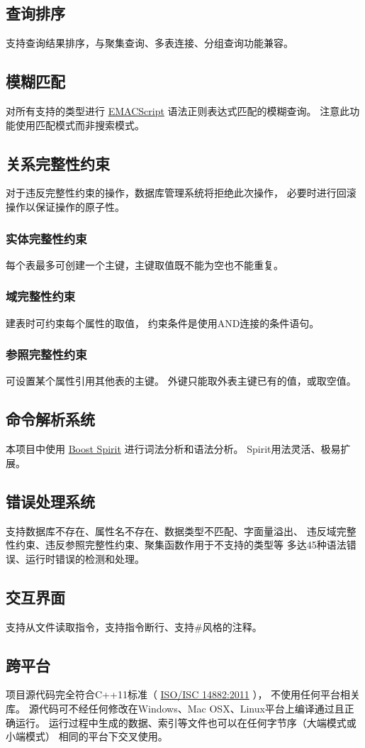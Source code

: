     \subsection{查询排序}
        支持查询结果排序，与聚集查询、多表连接、分组查询功能兼容。
    \subsection{模糊匹配}
        对所有支持的类型进行%
        \href{http://ecma-international.org/ecma-262/5.1/#sec-15.10}{EMACScript}%
        语法正则表达式匹配的模糊查询。%
        注意此功能使用匹配模式而非搜索模式。
    \subsection{关系完整性约束}
        对于违反完整性约束的操作，数据库管理系统将拒绝此次操作，%
        必要时进行回滚操作以保证操作的原子性。
        \subsubsection{实体完整性约束}
            每个表最多可创建一个主键，主键取值既不能为空也不能重复。
        \subsubsection{域完整性约束}
            建表时可约束每个属性的取值，%
            约束条件是使用AND连接的条件语句。%
        \subsubsection{参照完整性约束}
            可设置某个属性引用其他表的主键。%
            外键只能取外表主键已有的值，或取空值。
    \subsection{命令解析系统}
        本项目中使用%
        \href{http://www.boost.org/doc/libs/1_57_0/libs/spirit/doc/html/index.html}{Boost Spirit}%
        进行词法分析和语法分析。%
        Spirit用法灵活、极易扩展。
    \subsection{错误处理系统}
        支持数据库不存在、属性名不存在、数据类型不匹配、字面量溢出、%
        违反域完整性约束、违反参照完整性约束、聚集函数作用于不支持的类型等%
        多达45种语法错误、运行时错误的检测和处理。
    \subsection{交互界面}
        支持从文件读取指令，支持指令断行、支持\#风格的注释。
    \subsection{跨平台}
        项目源代码完全符合C++11标准（%
        \href{https://isocpp.org/std/the-standard}{ISO/ISC 14882:2011}%
        ），%
        不使用任何平台相关库。%
        源代码可不经任何修改在Windows、Mac OSX、Linux平台上编译通过且正确运行。%
        运行过程中生成的数据、索引等文件也可以在任何字节序（大端模式或小端模式）%
        相同的平台下交叉使用。


